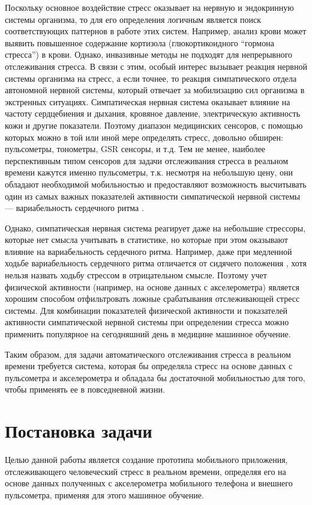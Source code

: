 \documentclass[14pt]{matmex-diploma-custom}
\begin{document}
Поскольку основное воздействие стресс оказывает на нервную и эндокринную системы
организма, то для его определения логичным является поиск соответствующих
паттернов в работе этих систем. Например, анализ крови может выявить повышенное
содержание кортизола (глюкортикоидного ``гормона стресса'') в крови. Однако,
инвазивные методы не подходят для непрерывного отслеживания стресса. В связи с
этим, особый интерес вызывает реакция нервной системы организма на стресс, а
если точнее, то реакция симпатического отдела автономной нервной системы,
который отвечает за мобилизацию сил организма в экстренных ситуациях.
Симпатическая нервная система оказывает влияние на частоту сердцебиения и
дыхания, кровяное давление, электрическую активность кожи и другие показатели.
Поэтому диапазон медицинских сенсоров, с помощью которых можно в той или иной
мере определять стресс, довольно обширен: пульсометры, тонометры, GSR сенсоры, и
т.д. Тем не менее, наиболее перспективным типом сенсоров для задачи отслеживания
стресса в реальном времени кажутся именно пульсометры, т.к. несмотря на
небольшую цену, они обладают необходимой мобильностью и предоставляют
возможность высчитывать один из самых важных показателей активности
симпатической нервной системы --- вариабельность сердечного ритма
\cite{article:hrv_stress}.

Однако, симпатическая нервная система реагирует даже на небольшие стрессоры,
которые нет смысла учитывать в статистике, но которые при этом оказывают влияние
на вариабельность сердечного ритма. Например, даже при медленной ходьбе
вариабельность сердечного ритма отличается от сидячего положения
\cite{article:hrv_reliability}, хотя нельзя назвать ходьбу стрессом в
отрицательном смысле. Поэтому учет физической активности (например, на основе
данных с акселерометра) является хорошим способом отфильтровать ложные
срабатывания отслеживающей стресс системы. Для комбинации показателей физической
активности и показателей активности симпатической нервной системы при
определении стресса можно применить популярное на сегодняшний день в медицине
машинное обучение.

Таким образом, для задачи автоматического отслеживания стресса в реальном
времени требуется система, которая бы определяла стресс на основе данных с
пульсометра и акселерометра и обладала бы достаточной мобильностью для того,
чтобы применять ее в повседневной жизни.
	
\section{Постановка задачи}
Целью данной работы является создание прототипа мобильного приложения,
отслеживающего человеческий стресс в реальном времени, определяя его на основе
данных полученных с акселерометра мобильного телефона и внешнего пульсометра,
применяя для этого машинное обучение.
\end{document}
